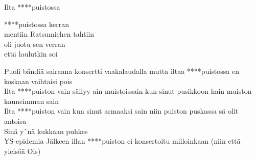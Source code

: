 \begin{song}{Ilta ****puistossa}

    ****puistossa kerran\\
    mentiin Ratsumiehen tahtiin\\
    oli juotu sen verran\\
    että laulutkin soi

    Puoli bändiä sairaana konsertti vaakalaudalla mutta iltaa ****puistossa en koskaan vaihtaisi pois\\
    Ilta ****puiston vain säilyy ain muistoissain kun sinut pusikkoon hain muiston kauneimman sain\\
    Ilta ****puiston vain kun sinut armaaksi sain niin puiston puskassa sä olit antoisa\\
    Sinä yˆnä kukkaan puhkes\\
    YS-epidemia Jälkeen illan ****puiston ei konsertoitu milloinkaan (niin että yleisöä Ois)


\end{song}